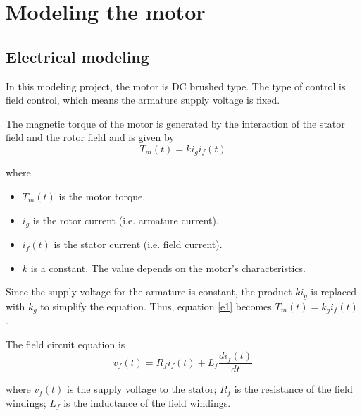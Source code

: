 \chapter{Modeling the motor}

\section{Electrical modeling}

In this modeling project, the motor is DC brushed type. The type of control is field control, which means the armature supply voltage is fixed.

The magnetic torque of the motor is generated by the interaction of the stator field and the rotor field and is given by
\begin{equation}\label{e1}
	T_m(t) = ki_gi_f(t)
\end{equation}

where
\begin{itemize}
	\item $ T_m(t) $ is the motor torque.
	\item $ i_g $ is the rotor current (i.e. armature current).
	\item $ i_f(t) $ is the stator current (i.e. field current).
	\item $ k $ is a constant. The value depends on the motor's characteristics.
\end{itemize}

Since the supply voltage for the armature is constant, the product $ ki_g $ is replaced with $ k_g $ to simplify the equation. Thus, equation \ref{e1} becomes $ T_m(t) = k_g i_f(t) $.
%

%

The field circuit equation is
\begin{equation}\label{e2}
	v_f(t) = R_fi_f(t) + L_f \dfrac{di_f(t)}{dt}
\end{equation}

where $ v_f(t) $ is the supply voltage to the stator; $ R_f $ is the resistance of the field windings; $ L_f $ is the inductance of the field windings.

